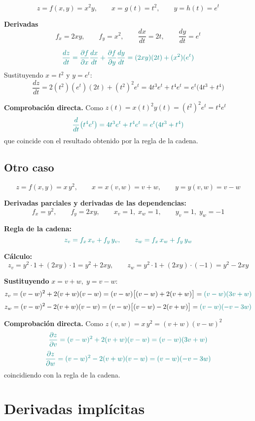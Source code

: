 \documentclass{article}
\begin{document}
\[
z=f(x,y)=x^{2}y, 
\qquad x=g(t)=t^{2}, 
\qquad y=h(t)=e^{t}
\]

\textbf{Derivadas}
\[
f_x=2xy, \qquad f_y=x^{2},
\qquad \frac{dx}{dt}=2t, \qquad \frac{dy}{dt}=e^{t}
\]

\[ \color{teal}
\frac{dz}{dt}
=\frac{\partial f}{\partial x}\frac{dx}{dt}
+\frac{\partial f}{\partial y}\frac{dy}{dt}
= (2xy)(2t) + (x^{2})(e^{t})
\]
Sustituyendo \(x=t^{2}\) y \(y=e^{t}\):
\[
\frac{dz}{dt}
= 2(t^{2})(e^{t})(2t) + (t^{2})^{2}e^{t}
= 4t^{3}e^{t} + t^{4}e^{t}
= e^{t}\big(4t^{3}+t^{4}\big)
\]

\textbf{Comprobación directa.}
Como \(z(t)=x(t)^{2}y(t)=(t^{2})^{2}e^{t}=t^{4}e^{t}\)
\[ \color{teal}
\frac{d}{dt}\big(t^{4}e^{t}\big)
=4t^{3}e^{t}+t^{4}e^{t}
= e^{t}(4t^{3}+t^{4})
\]
que coincide con el resultado obtenido por la regla de la cadena.



\subsection*{Otro caso}

\[
z=f(x,y)=x\,y^{2}, 
\qquad x=x(v,w)=v+w, 
\qquad y=y(v,w)=v-w
\]

\textbf{Derivadas parciales y derivadas de las dependencias:}
\[
f_x=y^{2},\qquad f_y=2xy,\qquad 
x_v=1,\; x_w=1,\qquad 
y_v=1,\; y_w=-1
\]

\textbf{Regla de la cadena:}
\[\color{teal}
{\;z_v=f_x\,x_v+f_y\,y_v,\qquad z_w=f_x\,x_w+f_y\,y_w\;}
\]

\textbf{Cálculo:}
\[
z_v = y^{2}\cdot 1 + (2xy)\cdot 1 = y^{2}+2xy,
\qquad
z_w = y^{2}\cdot 1 + (2xy)\cdot(-1) = y^{2}-2xy
\]

\textbf{Sustituyendo } \(x=v+w,\; y=v-w\):
\[
z_v = (v-w)^{2} + 2(v+w)(v-w)
     = (v-w)\big[(v-w)+2(v+w)\big]
     =\color{teal} (v-w)(3v+w)
\]
\[
z_w = (v-w)^{2} - 2(v+w)(v-w)
     = (v-w)\big[(v-w)-2(v+w)\big]
     =\color{teal} (v-w)(-v-3w)
\]

\textbf{Comprobación directa.}
Como \(z(v,w)=x\,y^{2}=(v+w)(v-w)^{2}\)
\[\color{teal}
\frac{\partial z}{\partial v}
= (v-w)^{2}+2(v+w)(v-w)
= (v-w)(3v+w)
\]
\[\color{teal}
\frac{\partial z}{\partial w}
= (v-w)^{2}-2(v+w)(v-w)
= (v-w)(-v-3w)
\]
coincidiendo con la regla de la cadena.






\newpage

\section{Derivadas implícitas}
\end{document}
